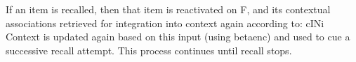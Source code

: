 {}If an item is recalled, then that item is reactivated on \markdownRendererDollarSign{}F\markdownRendererDollarSign{}, and its contextual associations retrieved for integration into context again according to:\markdownRendererInterblockSeparator
{}\markdownRendererDollarSign{}\markdownRendererDollarSign{}c\markdownRendererCircumflex{}\markdownRendererLeftBrace{}IN\markdownRendererRightBrace{}\markdownRendererLeftBrace{}i\markdownRendererRightBrace{}\markdownRendererDollarSign{}\markdownRendererDollarSign{}\markdownRendererInterblockSeparator
{}Context is updated again based on this input (using \markdownRendererDollarSign{}\markdownRendererBackslash{}betaenc\markdownRendererDollarSign{}) and used to cue a successive recall attempt. This process continues until recall stops.\relax